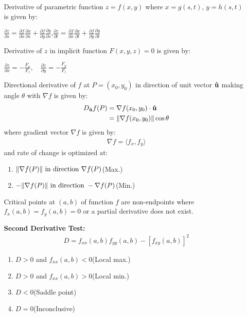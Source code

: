 \documentclass[12pt, a4paper]{article}
\begin{document}
\begin{multicols*}{3}
Derivative of parametric function $z=f(x,y)$ where $x=g(s,t)$, $y=h(s,t)$ is given by:\\\vspace{0.5em}
{\centering
  $\displaystyle \frac{\partial z}{\partial s} = \frac{\partial f}{\partial x}\frac{\partial x}{\partial s} + \frac{\partial f}{\partial y} \frac{\partial y}{\partial s}$,\quad$\displaystyle \frac{\partial z}{\partial t} = \frac{\partial f}{\partial x}\frac{\partial x}{\partial t} + \frac{\partial f}{\partial y} \frac{\partial y}{\partial t}$
\par}

Derivative of $z$ in implicit function $F(x,y,z) = 0$ is given by:\\
{\centering
  $\displaystyle \frac{\partial z}{\partial x} = -\frac{F_x}{F_z},\quad\frac{\partial z}{\partial y} = -\frac{F_y}{F_z}$
\par}

\vspace{1em}
Directional derivative of $f$ at $P = (x_0,y_0)$ in direction of unit vector $\mathbf{\hat{u}}$ making angle $\theta$ with $\nabla f$ is given by:
\begin{align*}
  D_{\mathbf{\hat{u}}}f(P) &= \nabla f(x_0,y_0)\cdot \mathbf{\hat{u}}\\
                   &= \lVert\nabla f(x_0, y_0)\rVert\cos\theta
\end{align*}
where gradient vector $\nabla f$ is given by:
\begin{align*}
  \nabla f = \langle f_x, f_y \rangle
\end{align*}
and rate of change is optimized at:
\begin{enumerate}[\roman*.]
  \item $\lVert\nabla f(P)\rVert\text{ in direction }\nabla f(P)$\hfill{(Max.)}
  \item $-\lVert\nabla f(P)\rVert\text{ in direction }-\nabla f(P)$\hfill{(Min.)}
\end{enumerate}

\vspace{1em}
Critical points at $(a,b)$ of function $f$ are non-endpoints where $f_x(a,b)=f_y(a,b)=0$ or a partial derivative does not exist.

\textbf{Second Derivative Test:}
\begin{align*}
  D = f_{xx}(a,b)f_{yy}(a,b)-[f_{xy}(a,b)]^2
\end{align*}
\begin{enumerate}[\roman*.]
  \item $D>0$ and $f_{xx}(a,b)<0$\hfill(Local max.)
  \item $D>0$ and $f_{xx}(a,b)>0$\hfill(Local min.)
  \item $D<0$\hfill(Saddle point)
  \item $D=0$\hfill(Inconclusive)
\end{enumerate}
\colbreak

\end{multicols*}
\end{document}
